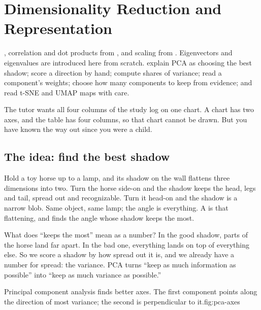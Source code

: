 \chapter{Dimensionality Reduction and Representation}
\label{ch:dimred}

\chapterguide%
  {, correlation and dot products from , and scaling from . Eigenvectors and eigenvalues are introduced here from scratch.}
  {explain PCA as choosing the best shadow; score a direction by hand; compute shares of variance; read a component's weights; choose how many components to keep from evidence; and read t-SNE and UMAP maps with care.}

The tutor wants all four columns of the study log on one chart. A chart has two axes, and the table has four columns, so that chart cannot be drawn. But you have known the way out since you were a child.

\section{The idea: find the best shadow}

\begin{analogy}
Hold a toy horse up to a lamp, and its shadow on the wall flattens three dimensions into two. Turn the horse side-on and the shadow keeps the head, legs and tail, spread out and recognizable. Turn it head-on and the shadow is a narrow blob. Same object, same lamp; the angle is everything. A  is that flattening, and  finds the angle whose shadow keeps the most.
\end{analogy}

What does ``keeps the most'' mean as a number? In the good shadow, parts of the horse land far apart. In the bad one, everything lands on top of everything else. So we score a shadow by how spread out it is, and we already have a number for spread: the variance. PCA turns ``keep as much information as possible'' into ``keep as much variance as possible.''

\begin{utpfig}{Principal component analysis finds better axes. The first component points along the direction of most variance; the second is perpendicular to it.}{fig:pca-axes}
\end{utpfig}

